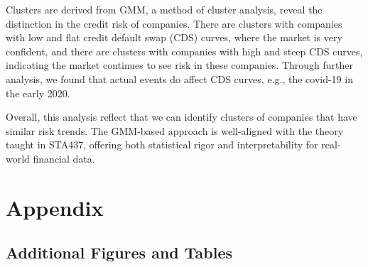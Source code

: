 \documentclass[
  letterpaper,
  DIV=11,
  numbers=noendperiod]{scrartcl}
\begin{document}
Clusters are derived from GMM, a method of cluster analysis, reveal the
distinction in the credit risk of companies. There are clusters with
companies with low and flat credit default swap (CDS) curves, where the
market is very confident, and there are clusters with companies with
high and steep CDS curves, indicating the market continues to see risk
in these companies. Through further analysis, we found that actual
events do affect CDS curves, e.g., the covid-19 in the early 2020.

Overall, this analysis reflect that we can identify clusters of
companies that have similar risk trends. The GMM-based approach is
well-aligned with the theory taught in STA437, offering both statistical
rigor and interpretability for real-world financial data.

\newpage

\hypertarget{sec-appendix}{%
\section{Appendix}\label{sec-appendix}}

\hypertarget{sec-add-fig-tbl}{%
\subsection{Additional Figures and Tables}\label{sec-add-fig-tbl}}
\end{document}
